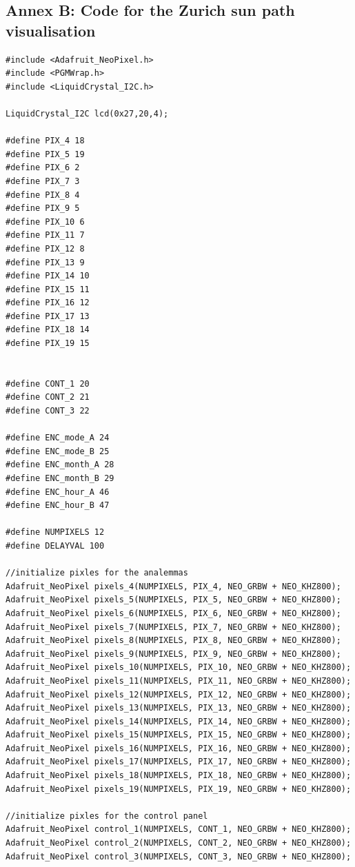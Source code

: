 \documentclass[a4paper,9pt]{article}
\begin{document}
\subsection*{Annex B: Code for the Zurich sun path visualisation}
\label{anB}
\begin{lstlisting}[basicstyle=\tiny,style=CStyle]
#include <Adafruit_NeoPixel.h>
#include <PGMWrap.h>
#include <LiquidCrystal_I2C.h>

LiquidCrystal_I2C lcd(0x27,20,4);

#define PIX_4 18
#define PIX_5 19
#define PIX_6 2
#define PIX_7 3
#define PIX_8 4
#define PIX_9 5
#define PIX_10 6
#define PIX_11 7
#define PIX_12 8
#define PIX_13 9
#define PIX_14 10
#define PIX_15 11
#define PIX_16 12
#define PIX_17 13
#define PIX_18 14
#define PIX_19 15


#define CONT_1 20
#define CONT_2 21
#define CONT_3 22

#define ENC_mode_A 24
#define ENC_mode_B 25
#define ENC_month_A 28
#define ENC_month_B 29
#define ENC_hour_A 46
#define ENC_hour_B 47

#define NUMPIXELS 12
#define DELAYVAL 100

//initialize pixles for the analemmas
Adafruit_NeoPixel pixels_4(NUMPIXELS, PIX_4, NEO_GRBW + NEO_KHZ800);
Adafruit_NeoPixel pixels_5(NUMPIXELS, PIX_5, NEO_GRBW + NEO_KHZ800);
Adafruit_NeoPixel pixels_6(NUMPIXELS, PIX_6, NEO_GRBW + NEO_KHZ800);
Adafruit_NeoPixel pixels_7(NUMPIXELS, PIX_7, NEO_GRBW + NEO_KHZ800);
Adafruit_NeoPixel pixels_8(NUMPIXELS, PIX_8, NEO_GRBW + NEO_KHZ800);
Adafruit_NeoPixel pixels_9(NUMPIXELS, PIX_9, NEO_GRBW + NEO_KHZ800);
Adafruit_NeoPixel pixels_10(NUMPIXELS, PIX_10, NEO_GRBW + NEO_KHZ800);
Adafruit_NeoPixel pixels_11(NUMPIXELS, PIX_11, NEO_GRBW + NEO_KHZ800);
Adafruit_NeoPixel pixels_12(NUMPIXELS, PIX_12, NEO_GRBW + NEO_KHZ800);
Adafruit_NeoPixel pixels_13(NUMPIXELS, PIX_13, NEO_GRBW + NEO_KHZ800);
Adafruit_NeoPixel pixels_14(NUMPIXELS, PIX_14, NEO_GRBW + NEO_KHZ800);
Adafruit_NeoPixel pixels_15(NUMPIXELS, PIX_15, NEO_GRBW + NEO_KHZ800);
Adafruit_NeoPixel pixels_16(NUMPIXELS, PIX_16, NEO_GRBW + NEO_KHZ800);
Adafruit_NeoPixel pixels_17(NUMPIXELS, PIX_17, NEO_GRBW + NEO_KHZ800);
Adafruit_NeoPixel pixels_18(NUMPIXELS, PIX_18, NEO_GRBW + NEO_KHZ800);
Adafruit_NeoPixel pixels_19(NUMPIXELS, PIX_19, NEO_GRBW + NEO_KHZ800);

//initialize pixles for the control panel
Adafruit_NeoPixel control_1(NUMPIXELS, CONT_1, NEO_GRBW + NEO_KHZ800);
Adafruit_NeoPixel control_2(NUMPIXELS, CONT_2, NEO_GRBW + NEO_KHZ800);
Adafruit_NeoPixel control_3(NUMPIXELS, CONT_3, NEO_GRBW + NEO_KHZ800);




\end{lstlisting}
\end{document}
